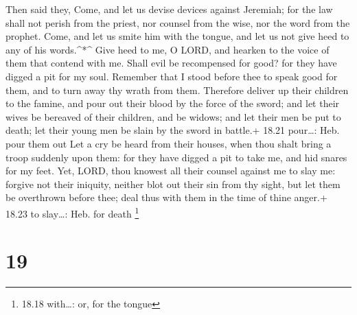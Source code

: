  Then said they, Come, and let us devise devices against
Jeremiah; for the law shall not perish from the priest, nor counsel from
the wise, nor the word from the prophet. Come, and let us smite him with
the tongue, and let us not give heed to any of his words.\^{}*\^{}
 Give heed to me, O LORD, and hearken to the voice of them
that contend with me.  Shall evil be recompensed for good?
for they have digged a pit for my soul. Remember that I stood before
thee to speak good for them, and to turn away thy wrath from them.
 Therefore deliver up their children to the famine, and
pour out their blood by the force of the sword; and let their wives be
bereaved of their children, and be widows; and let their men be put to
death; let their young men be slain by the sword in battle.+ 18.21
pour\ldots: Heb. pour them out  Let a cry be heard from
their houses, when thou shalt bring a troop suddenly upon them: for they
have digged a pit to take me, and hid snares for my feet. 
Yet, LORD, thou knowest all their counsel against me to slay me: forgive
not their iniquity, neither blot out their sin from thy sight, but let
them be overthrown before thee; deal thus with them in the time of thine
anger.+ 18.23 to slay\ldots: Heb. for death \footnote{18.18 with\ldots:
  or, for the tongue}

\hypertarget{section-18}{%
\section{19}\label{section-18}}

